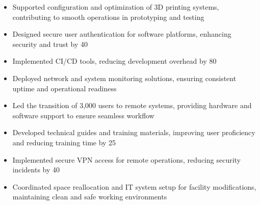 \par\smallskip
\noindent
\begin{minipage}{20cm}
  \begin{minipage}{9.75cm}
    \begin{itemize}
      \item Supported configuration and optimization of 3D printing systems, contributing to smooth operations in prototyping and testing
      \item Designed secure user authentication for software platforms, enhancing security and trust by 40%
    \end{itemize}
  \end{minipage}
  \hfill
  \begin{minipage}{9.75cm}
    \begin{itemize}
      \item Implemented CI/CD tools, reducing development overhead by 80%
      \item Deployed network and system monitoring solutions, ensuring consistent uptime and operational readiness
    \end{itemize}
  \end{minipage}
\end{minipage}
\par\smallskip
\divider

\par\smallskip
\noindent
\begin{minipage}{20cm}
  \begin{minipage}{9.75cm}
    \begin{itemize}
      \item Led the transition of 3,000 users to remote systems, providing hardware and software support to ensure seamless workflow
      \item Developed technical guides and training materials, improving user proficiency and reducing training time by 25%
    \end{itemize}
  \end{minipage}
  \hfill
  \begin{minipage}{9.75cm}
    \begin{itemize}
      \item Implemented secure VPN access for remote operations, reducing security incidents by 40%
      \item Coordinated space reallocation and IT system setup for facility modifications, maintaining clean and safe working environments
    \end{itemize}
  \end{minipage}
\end{minipage}

